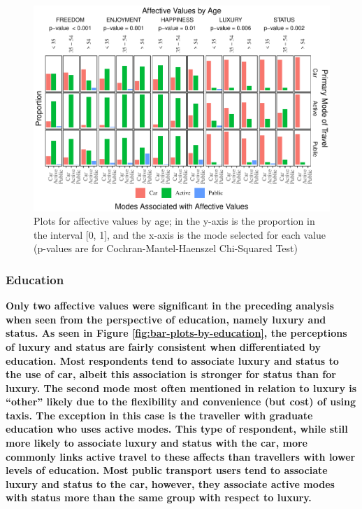 \documentclass[]{elsarticle} %
\makeatletter
\def\maxwidth{\ifdim\Gin@nat@width>\linewidth\linewidth
\else\Gin@nat@width\fi}
\let\Oldincludegraphics\includegraphics
\renewcommand{\includegraphics}[1]{\Oldincludegraphics[width=\maxwidth]{#1}}
\makeatother
\begin{document}
\begin{figure}
\centering
\includegraphics{Dissonance_Santiago_v2_files/figure-latex/figure-bar-plots-by-attribute-and-age-1.pdf}
\caption{\label{fig:bar-plots-by-age}Plots for affective values by age;
in the y-axis is the proportion in the interval {[}0, 1{]}, and the
x-axis is the mode selected for each value (p-values are for
Cochran-Mantel-Haenszel Chi-Squared Test)}
\end{figure}

\hypertarget{education-1}{%
\subsubsection{Education}\label{education-1}}

\textbf{\textbf{Only two affective values were significant in the
preceding analysis when seen from the perspective of education, namely
luxury and status. As seen in Figure \ref{fig:bar-plots-by-education},
the perceptions of luxury and status are fairly consistent when
differentiated by education. Most respondents tend to associate luxury
and status to the use of car, albeit this association is stronger for
status than for luxury. The second mode most often mentioned in relation
to luxury is ``other'' likely due to the flexibility and convenience
(but cost) of using taxis. The exception in this case is the traveller
with graduate education who uses active modes. This type of respondent,
while still more likely to associate luxury and status with the car,
more commonly links active travel to these affects than travellers with
lower levels of education. Most public transport users tend to associate
luxury and status to the car, however, they associate active modes with
status more than the same group with respect to luxury.}}
\end{document}
